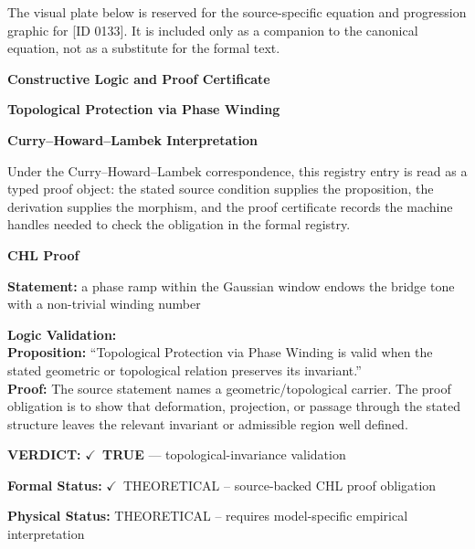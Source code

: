 \begingroup\footnotesize\sloppy
The visual plate below is reserved for the source-specific equation and progression graphic for [ID 0133]. It is included only as a companion to the canonical equation, not as a substitute for the formal text.
\par\endgroup
\ifTZPDarkEdition
{}
\fi

\clearpage
\begingroup\tzpsupportsetup
\noindent\textbf{\fontsize{10.8pt}{12.8pt}\selectfont [ID 0133] Constructive Logic and Proof Certificate}\par
\noindent\textbf{\fontsize{10pt}{12pt}\selectfont Topological Protection via Phase Winding}\par
\vspace{0.45em}
\begingroup
\footnotesize
\setlength{\parskip}{0.22em}
\setlength{\parindent}{0pt}
\noindent\textbf{Curry--Howard--Lambek Interpretation}\par
Under the Curry--Howard--Lambek correspondence, this registry entry is read as a typed proof
object: the stated source condition supplies the proposition, the derivation supplies the
morphism, and the proof certificate records the machine handles needed to check the obligation
in the formal registry.

\vspace{0.45em}
\noindent\textbf{CHL Proof}\par
\textbf{Statement:} a phase ramp within the Gaussian window endows the bridge tone with a non-trivial
winding number

\textbf{Logic Validation:}\\
\textbf{Proposition:} ``Topological Protection via Phase Winding is valid when the stated geometric or
topological relation preserves its invariant.''\\
\textbf{Proof:} The source statement names a geometric/topological carrier. The proof obligation is to
show that deformation, projection, or passage through the stated structure leaves the
relevant invariant or admissible region well defined.

\textbf{VERDICT:} \ensuremath{\checkmark}\ \textbf{TRUE} --- topological-invariance validation

\textbf{Formal Status:} \ensuremath{\checkmark}\ THEORETICAL -- source-backed CHL proof obligation

\textbf{Physical Status:} THEORETICAL -- requires model-specific empirical interpretation
\par\vspace{0.45em}
\par
\ifTZPDarkEdition
{}
\fi
\endgroup
\endgroup
